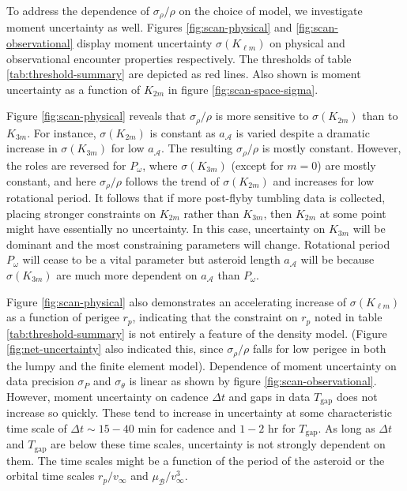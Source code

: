 \documentclass[fleqn,usenatbib]{mnras}
\begin{document}
To address the dependence of $\sigma_\rho / \rho$ on the choice of model, we investigate moment uncertainty as well. Figures \ref{fig:scan-physical} and \ref{fig:scan-observational} display moment uncertainty $\sigma(K_{\ell m})$ on physical and observational encounter properties respectively. The thresholds of table \ref{tab:threshold-summary} are depicted as red lines. Also shown is moment uncertainty as a function of $K_{2m}$ in figure \ref{fig:scan-space-sigma}.

Figure \ref{fig:scan-physical} reveals that $\sigma_\rho / \rho$ is more sensitive to $\sigma (K_{2m})$ than to $K_{3m}$. For instance, $\sigma(K_{2m})$ is constant as $a_\mathcal{A}$ is varied despite a dramatic increase in $\sigma(K_{3m})$ for low $a_\mathcal{A}$. The resulting $\sigma_\rho / \rho$ is mostly constant. However, the roles are reversed for $P_\omega$, where $\sigma(K_{3m})$ (except for $m=0$) are mostly constant, and here $\sigma_\rho /\rho$ follows the trend of $\sigma(K_{2m})$ and increases for low rotational period. It follows that if more post-flyby tumbling data is collected, placing stronger constraints on $K_{2m}$ rather than $K_{3m}$, then $K_{2m}$ at some point might have essentially no uncertainty. In this case, uncertainty on $K_{3m}$ will be dominant and the most constraining parameters will change. Rotational period $P_\omega$ will cease to be a vital parameter but asteroid length $a_\mathcal{A}$ will be because $\sigma(K_{3m})$ are much more dependent on $a_\mathcal{A}$ than $P_\omega$.

Figure \ref{fig:scan-physical} also demonstrates an accelerating increase of $\sigma(K_{\ell m})$ as a function of perigee $r_p$, indicating that the constraint on $r_p$ noted in table \ref{tab:threshold-summary} is not entirely a feature of the density model. (Figure \ref{fig:net-uncertainty} also indicated this, since $\sigma_\rho / \rho$ falls for low perigee in both the lumpy and the finite element model). Dependence of moment uncertainty on data precision $\sigma_P$ and $\sigma_\theta$ is linear as shown by figure \ref{fig:scan-observational}. However, moment uncertainty on cadence $\Delta t$ and gaps in data $T_\text{gap}$ does not increase so quickly. These tend to increase in uncertainty at some characteristic time scale of $\Delta t \sim 15 -40$ min for cadence and $1-2$ hr for $T_\text{gap}$. As long as $\Delta t$ and $T_\text{gap}$ are below these time scales, uncertainty is not strongly dependent on them. The time scales might be a function of the period of the asteroid or the orbital time scales $r_p / v_\infty$ and $\mu_\mathcal{B} / v_\infty^3$.
\end{document}
